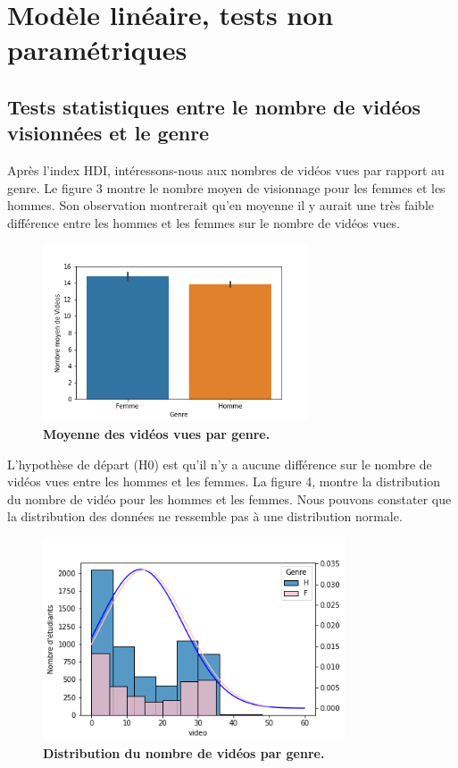 \documentclass[12pt, a4paper, titlepage, table]{article}
\begin{document}
\section{Modèle linéaire, tests non paramétriques}
\subsection{Tests statistiques entre le nombre de vidéos visionnées et le genre}
Après l'index HDI, intéressons-nous aux nombres de vidéos vues par rapport au genre. Le figure 3 montre le nombre moyen de visionnage pour les femmes et les hommes. Son observation montrerait qu'en moyenne il y aurait une très faible différence entre les hommes et les femmes sur le nombre de vidéos vues. 

	\begin{figure}[H]
		\centering
		\includegraphics[width=0.7\textwidth]{../../graph/mean_video.png}
		\caption{\textbf{Moyenne des vidéos vues par genre.}}
	\end{figure}

L'hypothèse de départ (H0) est qu'il n'y a aucune différence sur le nombre de vidéos vues entre les hommes et les femmes. La figure 4, montre la distribution du nombre de vidéo pour les hommes et les femmes. Nous pouvons constater que la distribution des données ne ressemble pas à une distribution normale.

	\begin{figure}[H]
		\centering
		\includegraphics[width=0.8\textwidth]{../../graph/distribution_video.png}
		\caption{\textbf{Distribution du nombre de vidéos par genre.}}
	\end{figure}
\end{document}
